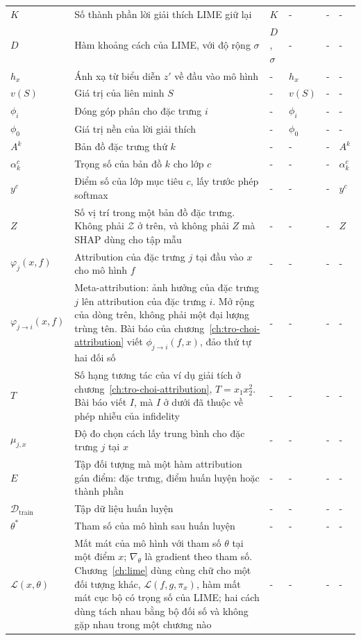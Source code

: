 \begin{longtable}{@{}lp{\kyhieuw}p{\kyhieuwmap}p{\kyhieuwmap}p{\kyhieuwmap}p{\kyhieuwlast}@{}}
$K$ & Số thành phần lời giải thích LIME giữ lại & $K$ & - & - & - \\
$D$ & Hàm khoảng cách của LIME, với độ rộng $\sigma$ & $D$, $\sigma$ & - & - & - \\
$h_x$ & Ánh xạ từ biểu diễn $z'$ về đầu vào mô hình & - & $h_x$ & - & - \\
$v(S)$ & Giá trị của liên minh $S$ & - & $v(S)$ & - & - \\
$\phi_i$ & Đóng góp phân cho đặc trưng $i$ & - & $\phi_i$ & - & - \\
$\phi_0$ & Giá trị nền của lời giải thích & - & $\phi_0$ & - & - \\
$A^k$ & Bản đồ đặc trưng thứ $k$ & - & - & - & $A^k$ \\
$\alpha_k^c$ & Trọng số của bản đồ $k$ cho lớp $c$ & - & - & - & $\alpha_k^c$ \\
$y^c$ & Điểm số của lớp mục tiêu $c$, lấy trước phép softmax & - & - & - & $y^c$ \\
$Z$ & Số vị trí trong một bản đồ đặc trưng. Không phải $\mathcal{Z}$ ở trên, và không phải $Z$ mà SHAP dùng cho tập mẫu & - & - & - & $Z$ \\
$\varphi_j(x,f)$ & Attribution của đặc trưng $j$ tại đầu vào $x$ cho mô hình $f$ & - & - & - & - \\
$\varphi_{j\to i}(x,f)$ & Meta-attribution: ảnh hưởng của đặc trưng $j$ lên attribution của đặc trưng $i$. Mở rộng của dòng trên, không phải một đại lượng trùng tên. Bài báo của chương~\ref{ch:tro-choi-attribution} viết $\phi_{j\to i}(f,x)$, đảo thứ tự hai đối số & - & - & - & - \\
$T$ & Số hạng tương tác của ví dụ giải tích ở chương~\ref{ch:tro-choi-attribution}, $T = x_1x_2^2$. Bài báo viết $I$, mà $I$ ở dưới đã thuộc về phép nhiễu của infidelity & - & - & - & - \\
$\mu_{j,x}$ & Độ đo chọn cách lấy trung bình cho đặc trưng $j$ tại $x$ & - & - & - & - \\
$E$ & Tập đối tượng mà một hàm attribution gán điểm: đặc trưng, điểm huấn luyện hoặc thành phần & - & - & - & - \\
$\mathcal{D}_{\mathrm{train}}$ & Tập dữ liệu huấn luyện & - & - & - & - \\
$\theta^{*}$ & Tham số của mô hình sau huấn luyện & - & - & - & - \\
$\mathcal{L}(x,\theta)$ & Mất mát của mô hình với tham số $\theta$ tại một điểm $x$; $\nabla_{\theta}$ là gradient theo tham số. Chương~\ref{ch:lime} dùng cùng chữ cho một đối tượng khác, $\mathcal{L}(f,g,\pi_x)$, hàm mất mát cục bộ có trọng số của LIME; hai cách dùng tách nhau bằng bộ đối số và không gặp nhau trong một chương nào & - & - & - & - \\

\end{longtable}
